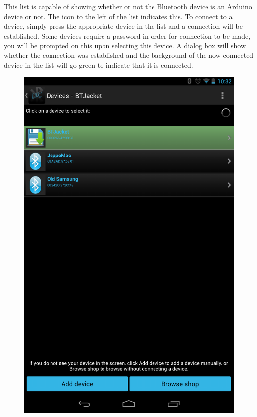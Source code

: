 \newline
This list is capable of showing whether or not the Bluetooth device is an Arduino device or not. The icon to the left of the list indicates this.
To connect to a device, simply press the appropriate device in the list and a connection will be established. Some devices require a password in order for connection to be made, you will be prompted on this upon selecting this device. A dialog box will show whether the connection was established and the background of the now connected device in the list will go green to indicate that it is connected. \\
\newline
\newline
\begin{figure}[H]
	\centering
	\includegraphics[scale = 0.3]{images/Screenshots/connected.png}
\end{figure}

